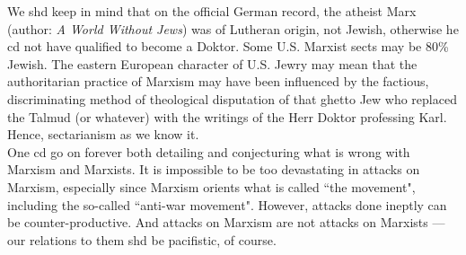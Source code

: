 \documentclass[12pt, onecolumn, letterpaper, oneside]{book}
\begin{document}
We shd keep in mind that on the official German record, the atheist Marx (author: \emph{A World Without Jews}) was of Lutheran origin, not Jewish, otherwise he cd not have qualified to become a Doktor. Some U.S. Marxist sects may be 80\% Jewish. The eastern European character of U.S. Jewry may mean that the authoritarian practice of Marxism may have been influenced by the factious, discriminating method of theological disputation of that ghetto Jew who replaced the Talmud (or whatever) with the writings of the Herr Doktor professing Karl. Hence, sectarianism as we know it.\\
One cd go on forever both detailing and conjecturing what is wrong with Marxism and Marxists. It is impossible to be too devastating in attacks on Marxism, especially since Marxism orients what is called ``the movement", including the so-called ``anti-war movement". However, attacks done ineptly can be counter-productive. And attacks on Marxism are not attacks on Marxists --- our relations to them shd be pacifistic, of course.
\end{document}
